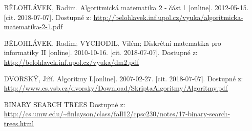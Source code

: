 \documentclass[
  biblatex=false,
  font=serif,
  glossaries=false,
  tables=false,
  theorems=false,
  index
]{kidiplom}
\begin{document}
\begin{thebibliography}{99}	

 \uppercase{BĚlohlávek}, Radim. Algoritmická matematika 2 - část 1 [online]. 2012-05-15. [cit. 2018-07-07]. Dostupné z: \url{http://belohlavek.inf.upol.cz/vyuka/algoritmicka-matematika-2-1.pdf}

 \uppercase{BĚlohlávek}, Radim; \uppercase{Vychodil}, Vilém; Diskrétní matematika pro informatiky II [online]. 2010-10-16. [cit. 2018-07-07]. Dostupné z: \url{http://belohlavek.inf.upol.cz/vyuka/dm2.pdf}

 \uppercase{DvorskÝ}, Jiří. Algoritmy I.[online]. 2007-02-27. [cit. 2018-07-07]. Dostupné z: \url{http://www.cs.vsb.cz/dvorsky/Download/SkriptaAlgoritmy/Algoritmy.pdf}

 \uppercase{Binary Search Trees}
Dostupné z: \url{http://cs.umw.edu/~finlayson/class/fall12/cpsc230/notes/17-binary-search-trees.html}

\end{thebibliography}
%
%



\printindex
\end{document}
